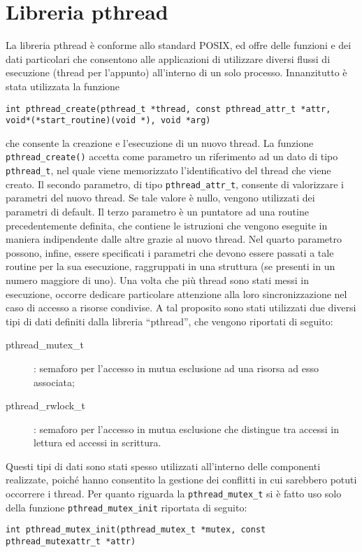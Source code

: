 \section{Libreria pthread}
La libreria pthread è conforme allo standard POSIX, ed offre delle funzioni e dei dati particolari che consentono alle applicazioni di utilizzare diversi flussi di esecuzione (thread per l’appunto) all’interno di un solo processo. 
Innanzitutto è stata utilizzata la funzione
\begin{center}
\texttt{int pthread\_create(pthread\_t *thread, const pthread\_attr\_t *attr, void*(*start\_routine)(void *), void *arg)}
\end{center}
che consente la creazione e l’esecuzione di un nuovo thread. La funzione \texttt{pthread\_create()} accetta come parametro un riferimento ad un dato di tipo \texttt{pthread\_t}, nel quale viene memorizzato l’identificativo del thread che viene creato. Il secondo parametro, di tipo \texttt{pthread\_attr\_t}, consente di valorizzare i parametri del nuovo thread. Se tale valore è nullo, vengono utilizzati dei parametri di default. Il terzo parametro è un puntatore ad una routine precedentemente definita, che contiene le istruzioni che vengono eseguite in maniera indipendente dalle altre grazie al nuovo thread. Nel quarto parametro possono, infine, essere specificati i parametri che devono essere passati a tale routine per la sua esecuzione, raggruppati in una struttura (se presenti in un numero maggiore di uno). Una volta che più thread sono stati messi in esecuzione, occorre dedicare particolare attenzione alla loro sincronizzazione nel caso di accesso a risorse condivise. A tal proposito sono stati utilizzati due diversi tipi di dati 
definiti dalla libreria “pthread”, che vengono riportati di seguito:
\begin{description}
\item[pthread\_mutex\_t]: semaforo per l’accesso in mutua esclusione ad una risorsa ad esso associata;
\item[pthread\_rwlock\_t]: semaforo per l'accesso in mutua esclusione che distingue tra accessi in lettura ed accessi in scrittura.
\end{description}
Questi tipi di dati sono stati spesso utilizzati all’interno delle componenti realizzate, poiché hanno consentito la gestione dei conflitti in cui sarebbero potuti occorrere i thread. Per quanto riguarda la \texttt{pthread\_mutex\_t} si è fatto uso solo della funzione \texttt{pthread\_mutex\_init} riportata di seguito:
\begin{center}
\texttt{int pthread\_mutex\_init(pthread\_mutex\_t *mutex, const pthread\_mutexattr\_t *attr)}
\end{center}
